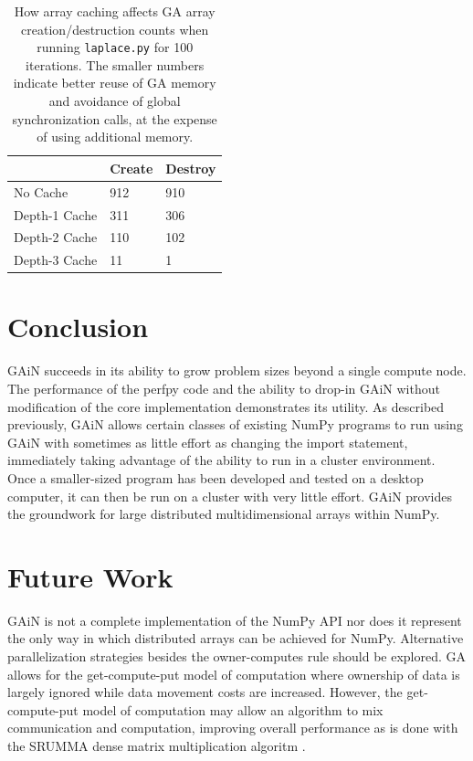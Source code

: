 \documentclass{sigplanconf}
\begin{document}
\begin{table}
\begin{center}
\begin{tabular}{l|l|l}
              & Create & Destroy \\
\hline
No Cache      & 912    & 910     \\
Depth-1 Cache & 311    & 306     \\
Depth-2 Cache & 110    & 102     \\
Depth-3 Cache &  11    &   1     \\
\end{tabular}
\caption{
How array caching affects GA array creation/destruction counts when running
\texttt{laplace.py} for 100 iterations. The smaller numbers indicate better
reuse of GA memory and avoidance of global synchronization calls, at the
expense of using additional memory.
}
\label{tab:cache}
\end{center}
\end{table}

\section{Conclusion}

GAiN succeeds in its ability to grow problem sizes beyond a single compute
node. The performance of the perfpy code and the ability to drop-in GAiN
without modification of the core implementation demonstrates its utility. As
described previously, GAiN allows certain classes of existing NumPy programs
to run using GAiN with sometimes as little effort as changing the import
statement, immediately taking advantage of the ability to run in a cluster
environment. Once a smaller-sized program has been developed and tested on a
desktop computer, it can then be run on a cluster with very little effort.
GAiN provides the groundwork for large distributed multidimensional arrays
within NumPy.

\section{Future Work}

GAiN is not a complete implementation of the NumPy API nor does it represent
the only way in which distributed arrays can be achieved for NumPy.
Alternative parallelization strategies besides the owner-computes rule should
be explored. GA allows for the get-compute-put model of computation where
ownership of data is largely ignored while data movement costs are increased.
However, the get-compute-put model of computation may allow an algorithm to
mix communication and computation, improving overall performance as is done
with the SRUMMA dense matrix multiplication algoritm \cite{Kri04}.
\end{document}
